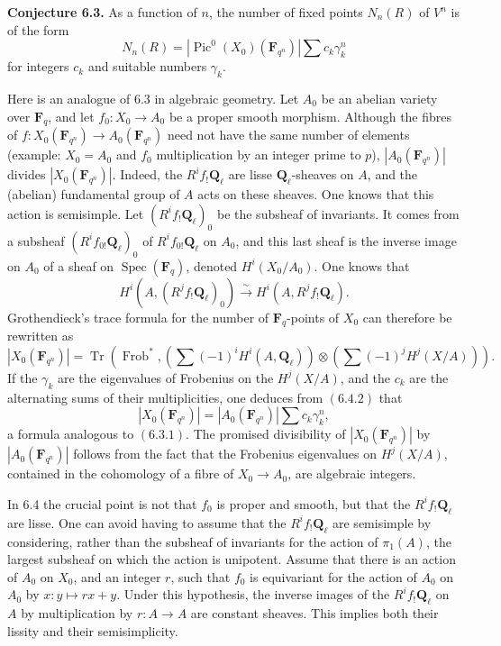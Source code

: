 \documentclass[11pt]{article}
\newcommand{\Ql}{\mathbf Q_\ell}
\newcommand{\Fq}{\mathbf F_q}
\newcommand{\Spec}{\operatorname{Spec}}
\newcommand{\Frob}{\operatorname{Frob}}
\newcommand{\Tr}{\operatorname{Tr}}
\newcommand{\Pic}{\operatorname{Pic}}
\begin{document}
\textbf{Conjecture 6.3.} As a function of \(n\), the number of fixed points \(N_n(R)\) of \(V^n\) is of the form
\begin{equation}\tag{6.3.1}
N_n(R)=|\Pic^0(X_0)(\mathbf F_{q^n})|\sum c_k\gamma_k^n
\end{equation}
for integers \(c_k\) and suitable numbers \(\gamma_k\).

Here is an analogue of 6.3 in algebraic geometry. Let \(A_0\) be an abelian variety over \(\Fq\), and let \(f_0:X_0\to A_0\) be a proper smooth morphism. Although the fibres of \(f:X_0(\mathbf F_{q^n})\to A_0(\mathbf F_{q^n})\) need not have the same number of elements (example: \(X_0=A_0\) and \(f_0\) multiplication by an integer prime to \(p\)), \(|A_0(\mathbf F_{q^n})|\) divides \(|X_0(\mathbf F_{q^n})|\). Indeed, the \(R^if_!\Ql\) are lisse \(\Ql\)-sheaves on \(A\), and the (abelian) fundamental group of \(A\) acts on these sheaves. One knows that this action is semisimple. Let \((R^if_!\Ql)_0\) be the subsheaf of invariants. It comes from a subsheaf \((R^if_{0!}\Ql)_0\) of \(R^if_{0!}\Ql\) on \(A_0\), and this last sheaf is the inverse image on \(A_0\) of a sheaf on \(\Spec(\Fq)\), denoted \(H^i(X_0/A_0)\). One knows that
\begin{equation}\tag{6.4.1}
H^i(A,(R^jf_!\Ql)_0)\xrightarrow{\sim}H^i(A,R^jf_!\Ql).
\end{equation}
Grothendieck's trace formula for the number of \(\Fq\)-points of \(X_0\) can therefore be rewritten as
\begin{equation}\tag{6.4.2}
|X_0(\mathbf F_{q^n})|=\Tr\left(\Frob^*,\left(\sum(-1)^iH^i(A,\Ql)\right)\otimes\left(\sum(-1)^jH^j(X/A)\right)\right).
\end{equation}
If the \(\gamma_k\) are the eigenvalues of Frobenius on the \(H^j(X/A)\), and the \(c_k\) are the alternating sums of their multiplicities, one deduces from \((6.4.2)\) that
\begin{equation}\tag{6.4.3}
|X_0(\mathbf F_{q^n})|=|A_0(\mathbf F_{q^n})|\sum c_k\gamma_k^n,
\end{equation}
a formula analogous to \((6.3.1)\). The promised divisibility of \(|X_0(\mathbf F_{q^n})|\) by \(|A_0(\mathbf F_{q^n})|\) follows from the fact that the Frobenius eigenvalues on \(H^j(X/A)\), contained in the cohomology of a fibre of \(X_0\to A_0\), are algebraic integers.

In 6.4 the crucial point is not that \(f_0\) is proper and smooth, but that the \(R^if_!\Ql\) are lisse. One can avoid having to assume that the \(R^if_!\Ql\) are semisimple by considering, rather than the subsheaf of invariants for the action of \(\pi_1(A)\), the largest subsheaf on which the action is unipotent. Assume that there is an action of \(A_0\) on \(X_0\), and an integer \(r\), such that \(f_0\) is equivariant for the action of \(A_0\) on \(A_0\) by \(x:y\mapsto rx+y\). Under this hypothesis, the inverse images of the \(R^if_!\Ql\) on \(A\) by multiplication by \(r:A\to A\) are constant sheaves. This implies both their lissity and their semisimplicity.
\end{document}
